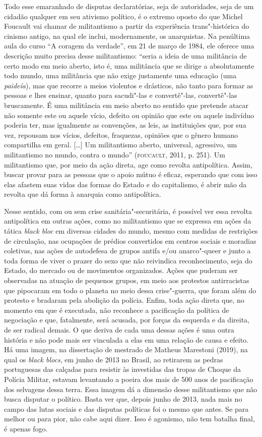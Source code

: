Todo esse emaranhado de disputas declaratórias, seja de autoridades,
seja de um cidadão qualquer em seu ativismo político, é o extremo oposto
do que Michel Foucault vai chamar de militantismo a partir da
experiência trans"-histórica do cinismo antigo, na qual ele inclui,
modernamente, os anarquistas. Na penúltima aula do curso ``A coragem da
verdade'', em 21 de março de 1984, ele oferece uma descrição muito
precisa desse militantismo: ``seria a ideia de uma militância de certo
modo em meio aberto, isto é, uma militância que se dirige a
absolutamente todo mundo, uma militância que não exige justamente uma
educação (uma \emph{paideía}), mas que recorre a meios violentos e
drásticos, não tanto para formar as pessoas e lhes ensinar, quanto para
sacudi"-las e convertê"-las, convertê"-las bruscamente. É uma militância em
meio aberto no sentido que pretende atacar não somente este ou aquele
vício, defeito ou opinião que este ou aquele indivíduo poderia ter, mas
igualmente as convenções, as leis, as instituições que, por sua vez,
repousam nos vícios, defeitos, fraquezas, opiniões que o gênero humano
compartilha em geral. {[}\ldots{}{]} Um militantismo aberto, universal,
agressivo, um militantismo no mundo, contra o mundo'' (\textsc{foucault}, 2011,
p. 251). Um militantismo que, por meio da ação direta, age como revolta
antipolítica. Assim, buscar provar para as pessoas que o apoio mútuo é
eficaz, esperando que com isso elas afastem suas vidas das formas do
Estado e do capitalismo, é abrir mão da revolta que dá forma à anarquia
como antipolítica.

Nesse sentido, com ou sem crise sanitária"-securitária, é possível ver
essa revolta antipolítica em outras ações, como no militantismo que se
expressa em ações da tática \emph{black bloc} em diversas cidades do
mundo, mesmo com medidas de restrições de circulação, nas ocupações de
prédios convertidos em centros sociais e moradias coletivas, nas ações
de autodefesa de grupos antifa e/ou anarco"-queer e junto a toda forma de
viver o prazer do sexo que não reivindica reconhecimento, seja do
Estado, do mercado ou de movimentos organizados. Ações que puderam ser
observadas na atuação de pequenos grupos, em meio aos protestos
antirracistas que pipocaram em todo o planeta no meio dessa
crise"-guerra, que foram além do protesto e bradaram pela abolição da
polícia. Enfim, toda ação direta que, no momento em que é executada, não
reconhece a pacificação da política de negociação e que, fatalmente,
será acusada, por forças da esquerda e da direita, de ser radical
demais. O que deriva de cada uma dessas ações é uma outra história e não
pode mais ser vinculada a elas em uma relação de causa e efeito. Há uma
imagem, na dissertação de mestrado de Matheus Marestoni (2019), na qual
os \emph{black blocs}, em junho de 2013 no Brasil, ao retirarem as
pedras portuguesas das calçadas para resistir às investidas das tropas
de Choque da Polícia Militar, estavam levantando a poeira dos mais de
500 anos de pacificação dos selvagens dessa terra. Essa imagem dá a
dimensão desse militantismo que não busca disputar o político. Basta ver
que, depois junho de 2013, nada mais no campo das lutas sociais e das
disputas políticas foi o mesmo que antes. Se para melhor ou para pior,
não cabe aqui dizer. Isso é agonismo, não tem batalha final, é apenas
fogo.

